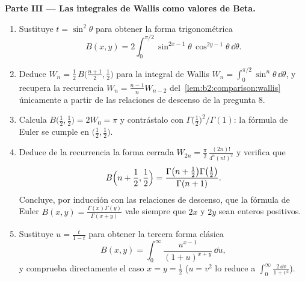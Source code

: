 \begin{problem}
\medskip
\noindent\textbf{Parte III --- Las integrales de Wallis como
valores de Beta.}
\begin{enumerate}[resume]
  \item Sustituye $t = \sin^2\theta$ para obtener la forma
        trigonométrica
        \[
        B(x, y) = 2\int_0^{\pi/2}
        \sin^{2x-1}\theta\,\cos^{2y-1}\theta\,\dd\theta .
        \]
  \item Deduce $W_n = \frac12\,B\bigl(\frac{n+1}2, \frac12\bigr)$
        para la integral de Wallis $W_n = \int_0^{\pi/2}\sin^n
        \theta\,\dd\theta$, y recupera la recurrencia $W_n =
        \frac{n-1}{n}W_{n-2}$ del~\cref{lem:b2:comparison:wallis}
        únicamente a partir de las relaciones de descenso de la
        pregunta 8.
  \item Calcula $B\bigl(\frac12, \frac12\bigr) = 2W_0 = \pi$ y
        contrástalo con $\Gamma\bigl(\frac12\bigr)^2/\Gamma(1)$: la
        fórmula de Euler se cumple en $\bigl(\frac12,
        \frac12\bigr)$.
  \item Deduce de la recurrencia la forma cerrada $W_{2n} =
        \frac\pi2\, \frac{(2n)!}{4^n(n!)^2}$ y verifica que
        \[
        B\Bigl(n + \frac12, \frac12\Bigr)
        = \frac{\Gamma\bigl(n + \frac12\bigr)\Gamma\bigl(
        \frac12\bigr)}{\Gamma(n+1)} .
        \]
        Concluye, por inducción con las relaciones de descenso, que
        la fórmula de Euler $B(x,y) =
        \frac{\Gamma(x)\Gamma(y)}{\Gamma(x+y)}$ vale siempre que
        $2x$ y $2y$ sean enteros positivos.
  \item Sustituye $u = \frac{t}{1-t}$ para obtener la tercera forma
        clásica
        \[
        B(x,y) = \int_0^\infty
        \frac{u^{x-1}}{(1+u)^{x+y}}\,\dd u ,
        \]
        y comprueba directamente el caso $x = y = \frac12$ ($u =
        v^2$ lo reduce a $\int_0^\infty\frac{2\,\dd v}{1+v^2}$).
\end{enumerate}


\end{problem}
